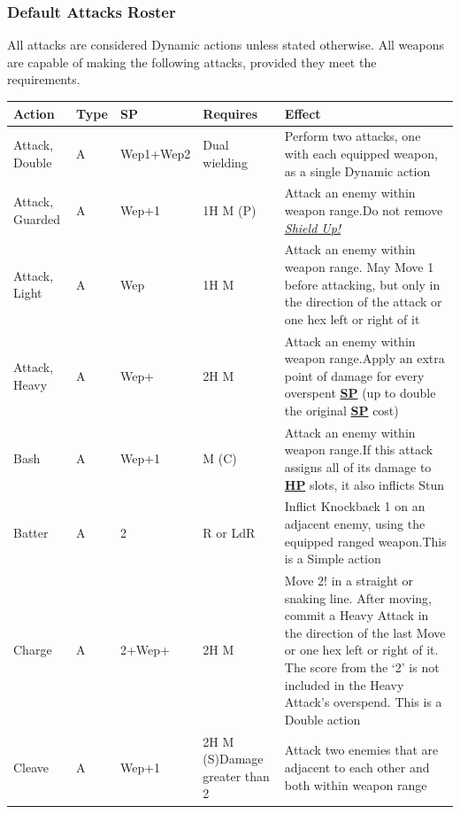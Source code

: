 \documentclass[12pt]{article}
\newcommand{\refto}[1]{\hyperlink{#1}{\textbf{#1}}}
\newcommand{\reftoit}[1]{\hyperlink{#1}{\emph{#1}}}
\begin{document}
\subsubsection{Default Attacks Roster}
All attacks are considered Dynamic actions unless stated otherwise. All weapons are capable of making the following attacks, provided they meet the requirements.\\
\begin{center}
\begin{tabularx}{\textwidth}{p{}p{}p{}p{}p{}}
\hline
\rowcolor{white} \textbf{Action} & \textbf{Type} & \textbf{SP} & \textbf{Requires} & \textbf{Effect}\setcounter{rownum}{0}\\
\hline
Attack, Double & A & Wep1+Wep2 & Dual wielding & Perform two attacks, one with each equipped weapon, as a single Dynamic action\\
Attack, Guarded & A & Wep+1 & 1H M (P) & Attack an enemy within weapon range.\newline Do not remove \reftoit{Shield Up!}\\
Attack, Light & A & Wep & 1H M & Attack an enemy within weapon range.\newline
May Move 1 before attacking, but only in the direction of the attack or one hex left or right of it\\
Attack, Heavy & A & Wep+ & 2H M & Attack an enemy within weapon range.\newline Apply an extra point of damage for every overspent \refto{SP} (up to double the original \refto{SP} cost)\\
Bash & A & Wep+1 & M (C) & Attack an enemy within weapon range.\newline If this attack assigns all of its damage to \refto{HP} slots, it also inflicts Stun\\
Batter & A & 2 & R or LdR & Inflict Knockback 1 on an adjacent enemy, using the equipped ranged weapon.\newline This is a Simple action\\
Charge & A & 2+Wep+ & 2H M & Move 2! in a straight or snaking line.\newline
After moving, commit a Heavy Attack in the direction of the last Move or one hex left or right of it.\newline
The score from the ‘2’ is not included in the Heavy Attack’s overspend.\newline
This is a Double action\\
Cleave & A & Wep+1 & 2H M (S)\newline Damage greater than 2 & Attack two enemies that are adjacent to each other and both within weapon range\\

\end{tabularx}
\end{center}
\end{document}
